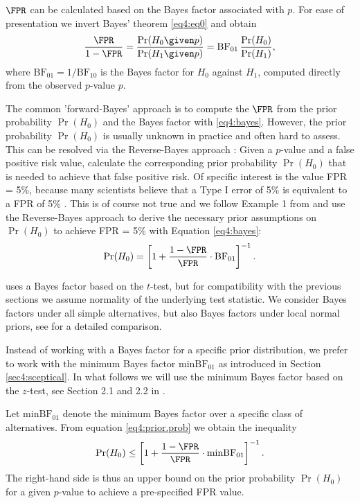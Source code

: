 $\FPR$ can be calculated based on the Bayes factor associated with $p$. For ease
of presentation we invert Bayes' theorem \eqref{eq4:eq0} and obtain
\begin{equation}\label{eq4:bayes}
      \frac{\FPR}{1-\FPR} = \frac{\Pr(H_0 \given p)}{\Pr(H_1 \given p)}
      = {\mbox{BF}_{01}} \, \frac{\Pr(H_0)}{\Pr(H_1)},
\end{equation}
where $\mbox{BF}_{01}=1/\mbox{BF}_{10}$ is the Bayes factor for $H_0$ against
$H_1$, computed directly from the observed $p$-value $p$.

The common 'forward-Bayes' approach is to compute the $\FPR$ from the prior
probability $\Pr(H_0)$ and the Bayes factor with \eqref{eq4:bayes}. However, the
prior probability $\Pr(H_0)$ is usually unknown in practice and often hard to
assess. This can be resolved via the Reverse-Bayes approach
\citep{Colquhoun2017,Colquhoun2019}: Given a $p$-value and a false positive risk
value, calculate the corresponding prior probability $\Pr(H_0)$ that is needed
to achieve that false positive risk. Of specific interest is the value FPR =
5\%, because many scientists believe that a Type I error of 5\% is equivalent to
a FPR of 5\% \citep{Greenland2016}. This is of course not true and we follow
Example 1 from \citet{Berger1987} and use the Reverse-Bayes approach to derive
the necessary prior assumptions on $\Pr(H_0)$ to achieve FPR = 5\% with Equation
\eqref{eq4:bayes}:
\begin{equation}
  \label{eq4:prior.prob}
     \Pr(H_0) = \left[ 1 + \frac{1-\FPR}{\FPR} \cdot \mbox{BF}_{01}  \right]^{-1}.
\end{equation}

\citet{Colquhoun2017} uses a Bayes factor based on the $t$-test, but for
compatibility with the previous sections we assume normality of the underlying
test statistic. We consider Bayes factors under all simple alternatives, but
also Bayes factors under local normal priors, see \citet{Held2018} for a
detailed comparison.

Instead of working with a Bayes factor for a specific prior distribution, we
prefer to work with the minimum Bayes factor $\mbox{minBF}_{01}$ as introduced
in Section \ref{sec4:sceptical}. In what follows we will use the minimum Bayes
factor based on the $z$-test, see Section 2.1 and 2.2 in \citet{Held2018}.


Let $\mbox{minBF}_{01}$ denote the minimum Bayes factor over a specific class of
alternatives. From equation \eqref{eq4:prior.prob} we obtain the inequality
\begin{equation}\label{eq4:prior.prob2}
    \Pr(H_0) \leq \left[ 1 + \frac{1-\FPR}{\FPR} \cdot \mbox{minBF}_{01}  \right]^{-1}.
\end{equation}
The right-hand side is thus an upper bound on the prior probability $\Pr(H_0)$
for a given $p$-value to achieve a pre-specified FPR value.


